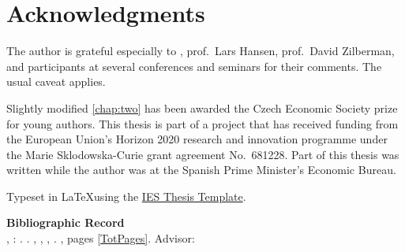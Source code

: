 \section*{Acknowledgments}
The author is grateful especially to \Supervisor, prof.\ Lars Hansen, prof.\ David Zilberman, and participants at several conferences and seminars for their comments. The usual caveat applies.

Slightly modified \autoref{chap:two} has been awarded the Czech Economic Society prize for young authors. This thesis is part of a project that has received funding from the European Union's Horizon 2020 research and innovation programme under the Marie Sklodowska-Curie grant agreement No.\ 681228. Part of this thesis was written while the author was at the Spanish Prime Minister's Economic Bureau.



\vfill

\noindent Typeset in \LaTeX  using the \href{https://is.cuni.cz/studium/eng/predmety/index.php?do=predmet&kod=JEM001}{IES Thesis Template}. 

\bigskip

\noindent \textbf{Bibliographic Record} \\
\LastNameDP, \FirstNameDP: \emph{\Bookname}. \BookName. \CUNI, \FSS, \IES, \Place. \Year, pages \ref*{TotPages}. Advisor: \Supervisor


